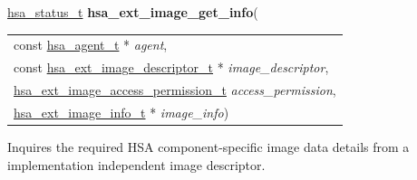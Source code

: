\documentclass[final]{book}
\newcommand{\hsaarg}[1]{\textit{#1}}
\begin{document}
\noindent\begin{tcolorbox}[breakable,nobeforeafter,colframe=white,colback=lightgray,left=0mm]
\hyperlink{group__status_1gad755322e7ff95456520e8abdbe90d225}{hsa_status_t} \hypertarget{group__images_1gae22dad8b80d13aec6c4e7b71834956ad}{\textbf{hsa_ext_image_get_info}}(
\vspace{-3.5mm}\begin{longtable}{@{}p{\textwidth}}
\hspace{1.7em}const \hyperlink{group__topology_1gab8db3fb886332a24acac08ec361e1d86}{hsa_agent_t} * \hsaarg{agent},\\
\hspace{1.7em}const \hyperlink{group__images_1gab0fe2967d35754650148d121fdef2032}{hsa_ext_image_descriptor_t} * \hsaarg{image_descriptor},\\
\hspace{1.7em}\hyperlink{group__images_1gab659478436fb8b92eae3ffe55f09e913}{hsa_ext_image_access_permission_t} \hsaarg{access_permission},\\
\hspace{1.7em}\hyperlink{group__images_1gac593c25dcf8f579ef2eb18e485d7351e}{hsa_ext_image_info_t} * \hsaarg{image_info})\end{longtable}

\end{tcolorbox}
Inquires the required HSA component-specific image data details from a implementation independent image descriptor.
\end{document}
